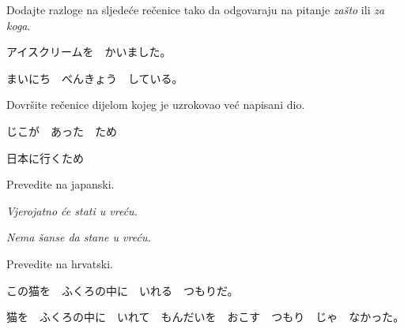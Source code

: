 	
	\begin{mondai}{Dodajte razloge na sljedeće rečenice tako da odgovaraju na pitanje \textit{zašto} ili \textit{za koga}.}
		\item アイスクリームを　かいました。
		\item まいにち　べんきょう　している。
	\end{mondai}

	\begin{mondai}{Dovršite rečenice dijelom kojeg je uzrokovao već napisani dio.}
		\item じこが　あった　ため
		\item 日本に行くため
	\end{mondai}

	\begin{mondai}{Prevedite na japanski.}
		\item \textit{Vjerojatno će stati u vreću.}
		\item \textit{Nema šanse da stane u vreću.}
	\end{mondai}

	\begin{mondai}{Prevedite na hrvatski.}
		\item この猫を　ふくろの中に　いれる　つもりだ。
		\item 猫を　ふくろの中に　いれて　もんだいを　おこす　つもり　じゃ　なかった。
	\end{mondai}
